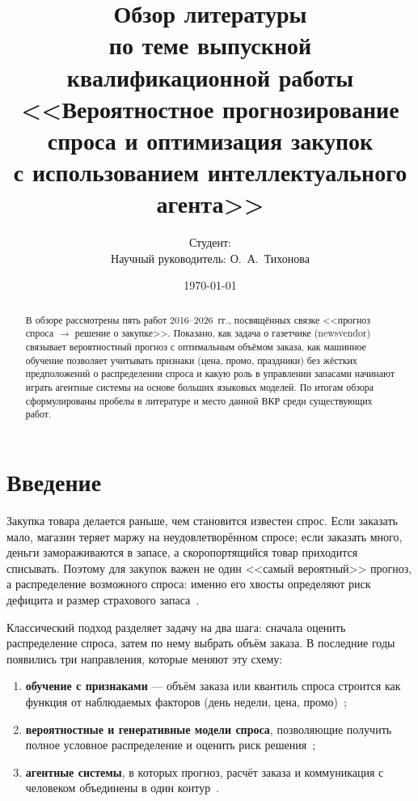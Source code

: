 \documentclass[12pt,a4paper]{article}
\title{\textbf{Обзор литературы}\\[4pt]
\large по теме выпускной квалификационной работы\\[2pt]
\large <<Вероятностное прогнозирование спроса и оптимизация закупок\\
с использованием интеллектуального агента>>}
\author{Студент: \underline{\hspace{6cm}}\\[2pt]
Научный руководитель: О.~А.~Тихонова}
\date{\today}
\begin{document}
\maketitle

\begin{abstract}
В обзоре рассмотрены пять работ 2016--2026~гг., посвящённых связке
<<прогноз спроса $\to$ решение о закупке>>. Показано, как задача
о газетчике (newsvendor) связывает вероятностный прогноз с оптимальным
объёмом заказа, как машинное обучение позволяет учитывать признаки
(цена, промо, праздники) без жёстких предположений о распределении
спроса и какую роль в управлении запасами начинают играть агентные
системы на основе больших языковых моделей. По итогам обзора
сформулированы пробелы в литературе и место данной ВКР среди
существующих работ.
\end{abstract}

\tableofcontents
\newpage

\section{Введение}

Закупка товара делается раньше, чем становится известен спрос.
Если заказать мало, магазин теряет маржу на неудовлетворённом спросе;
если заказать много, деньги замораживаются в запасе, а скоропортящийся
товар приходится списывать. Поэтому для закупок важен не один
<<самый вероятный>> прогноз, а распределение возможного спроса:
именно его хвосты определяют риск дефицита и размер страхового
запаса~\cite{silver2016inventory,hyndman2021fpp3}.

Классический подход разделяет задачу на два шага: сначала оценить
распределение спроса, затем по нему выбрать объём заказа.
В последние годы появились три направления, которые меняют эту схему:
\begin{enumerate}
  \item \textbf{обучение с признаками} --- объём заказа или квантиль
        спроса строится как функция от наблюдаемых факторов
        (день недели, цена, промо)~\cite{ban2019bigdata,oroojlooy2016deep};
  \item \textbf{вероятностные и генеративные модели спроса},
        позволяющие получить полное условное распределение и оценить
        риск решения~\cite{gong2024generative,ngartera2026stochastic};
  \item \textbf{агентные системы}, в которых прогноз, расчёт заказа
        и коммуникация с человеком объединены в один
        контур~\cite{syed2025agentic}.
\end{enumerate}
\end{document}
